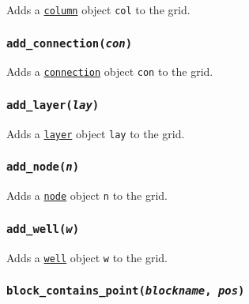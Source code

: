 Adds a \hyperref[columnobjects]{\texttt{column}} object \texttt{col} to the grid.

\begin{snugshade}\subsubsection{\texttt{add\_connection(\emph{con})}}\end{snugshade}
\label{sec:mulgrid:add_connection}

Adds a \hyperref[connectionobjects]{\texttt{connection}} object \texttt{con} to the grid.

\begin{snugshade}\subsubsection{\texttt{add\_layer(\emph{lay})}}\end{snugshade}
\label{sec:mulgrid:add_layer}

Adds a \hyperref[layerobjects]{\texttt{layer}} object \texttt{lay} to the grid.

\begin{snugshade}\subsubsection{\texttt{add\_node(\emph{n})}}\end{snugshade}
\label{sec:mulgrid:add_node}

Adds a \hyperref[nodeobjects]{\texttt{node}} object \texttt{n} to the grid.

\begin{snugshade}\subsubsection{\texttt{add\_well(\emph{w})}}\end{snugshade}
\label{sec:mulgrid:add_well}

Adds a \hyperref[wellobjects]{\texttt{well}} object \texttt{w} to the grid.

\begin{snugshade}\subsubsection{\texttt{block\_contains\_point(\emph{blockname}, \emph{pos})}}\end{snugshade}
\label{sec:mulgrid:block_contains_point}

